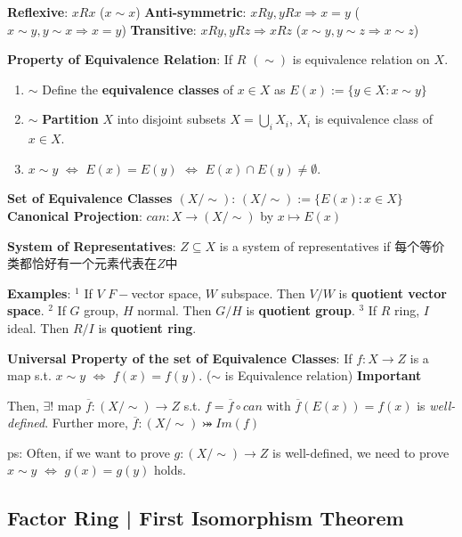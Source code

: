 \documentclass[9pt]{article}
\begin{document}
\quad \textbf{Reflexive}: $xRx$ {\scriptsize ($x\sim x$)} \quad \textbf{Anti-symmetric}: $xRy,yRx\Rightarrow x = y$ {\scriptsize ($x\sim y,y\sim x\Rightarrow x=y$)} \quad \textbf{Transitive}: $xRy,yRz\Rightarrow xRz$ {\scriptsize ($x\sim y,y\sim z\Rightarrow x\sim z$)}

\newpage

\textbf{Property of Equivalence Relation}: If $R$ $(\sim)$ is equivalence relation on $X$.

\begin{enumerate}[itemsep=-2pt, topsep=-2pt]
    \item $\sim$ Define the \textbf{equivalence classes} of $x\in X$ as $E(x):=\{y\in X:x\sim y\}$
    \item $\sim$ \textbf{Partition} $X$ into disjoint subsets $X=\bigcup_{i}X_i$, $X_i$ is equivalence class of $x\in X$.
    \item $x\sim y$ \quad $\Leftrightarrow$ \quad $E(x)=E(y)$ \quad $\Leftrightarrow$ \quad $E(x)\cap E(y)\ne\emptyset$.
\end{enumerate}

\textbf{Set of Equivalence Classes $(X/\sim)$}: $(X/\sim):=\{E(x):x\in X\}$ \qquad \textbf{Canonical Projection}: $can:X\to (X/\sim)$ by $x\mapsto E(x)$

\quad \textbf{System of Representatives}: $Z\subseteq X$ is a system of representatives if {\footnotesize 每个等价类都恰好有一个元素代表在$Z$中}

\quad \textbf{Examples}: {\tiny $^1$ If $V$ $F-$vector space, $W$ subspace. Then $V/W$ is \textbf{quotient vector space}. \quad $^2$ If $G$ group, $H$ normal. Then $G/H$ is \textbf{quotient group}. \quad $^3$ If $R$ ring, $I$ ideal. Then $R/I$ is \textbf{quotient ring}.}

\textbf{Universal Property of the set of Equivalence Classes}: If $f:X\to Z$ is a map s.t. $x\sim y$ $\Leftrightarrow$ $f(x)=f(y)$. {\tiny ($\sim$ is Equivalence relation) \textbf{Important}}

\quad Then, $\exists!$ map $\overline{f}:(X/\sim)\to Z$ s.t. $f=\overline{f}\circ can$ \quad with \quad $\overline{f}(E(x))=f(x)$ is \textit{well-defined}. \qquad Further more, $\overline{f}:(X/\sim)\bij Im(f)$

\quad ps: Often, if we want to prove $g:(X/\sim)\to Z$ is well-defined, we need to prove $x\sim y$ $\Leftrightarrow$ $g(x)=g(y)$ holds.


\subsection{Factor Ring | First Isomorphism Theorem} %
\end{document}
